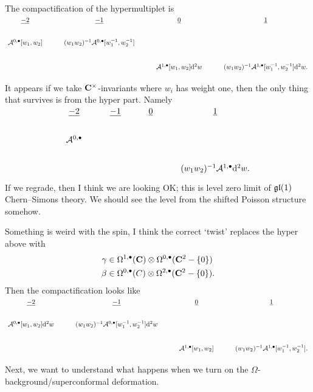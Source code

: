 \documentclass[11pt]{amsart}
\begin{document}
The compactification of the hypermultiplet is
\begin{equation}
\begin{tikzcd}
\ul{-2} & \ul{-1} & \ul{0} & \ul{1} \\
\cA^{0,\bu}[w_1,w_2] &  (w_1w_2)^{-1}\cA^{0,\bu} [w_1^{-1},w_2^{-1}] \\
& & \cA^{1,\bu}[w_1,w_2] \d^2 w &  (w_1w_2)^{-1}\cA^{1,\bu} [w_1^{-1},w_2^{-1}] \d^2 w .
\end{tikzcd}
\end{equation}

It appears if we take $\mathbf{C}^\times$-invariants where $w_i$ has weight one, then the only thing that survives is from the hyper part. 
Namely
\begin{equation}
\begin{tikzcd}
\ul{-2} & \ul{-1} & \ul{0} & \ul{1} \\
\cA^{0,\bu} &  & & \\
& & &  (w_1w_2)^{-1}\cA^{1,\bu} \d^2 w .
\end{tikzcd}
\end{equation}
If we regrade, then I think we are looking OK; this is level zero limit of $\mathfrak{gl}(1)$ Chern--Simons theory.
We should see the level from the shifted Poisson structure somehow.

Something is weird with the spin, I think the correct `twist' replaces the hyper above with 
\begin{align*}
\gamma & \in \Omega^{1,\bullet}(\mathbf{C}) \otimes \Omega^{0,\bullet}(\mathbf{C}^2 - \{0\}) \\
\beta & \in \Omega^{0,\bullet}(C) \otimes \Omega^{2,\bullet}(\mathbf{C}^2 - \{0\}) .
\end{align*}
Then the compactification looks like
\begin{equation}
\begin{tikzcd}
\ul{-2} & \ul{-1} & \ul{0} & \ul{1} \\
\cA^{0,\bu}[w_1,w_2] \d^2 w &  (w_1w_2)^{-1}\cA^{0,\bu} [w_1^{-1},w_2^{-1}] \d^2 w \\
& & \cA^{1,\bu}[w_1,w_2] &  (w_1w_2)^{-1}\cA^{1,\bu} [w_1^{-1},w_2^{-1}]  .
\end{tikzcd}
\end{equation}

Next, we want to understand what happens when we turn on the $\Omega$-background/superconformal deformation.

\cite{ButsonYoo}

\printbibliography
\end{document}
